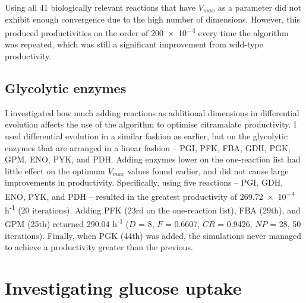 \documentclass[parskip=full, numbers=noenddot]{scrreprt}
\begin{document}
Using all 41 biologically relevant reactions that have $V_{max}$ as a parameter did not exhibit enough convergence due to the high number of dimensions. However, this produced productivities on the order of \num{200e-4} every time the algorithm was repeated, which was still a significant improvement from wild-type productivity.
\subsection{Glycolytic enzymes}
\label{ssec:glycolytic}


I investigated how much adding reactions as additional dimensions in differential evolution affects the use of the algorithm to optimise citramalate productivity. I used differential evolution in a similar fashion as earlier, but on the glycolytic enzymes that are arranged in a linear fashion --  PGI, PFK, FBA, GDH, PGK, GPM, ENO, PYK, and PDH. Adding enzymes lower on the one-reaction list had little effect on the optimum $V_{max}$ values found earlier, and did not cause large improvements in productivity.
Specifically, using five reactions -- PGI, GDH, ENO, PYK, and PDH -- resulted in the greatest productivity of \num{269.72e-4} h\textsuperscript{-1} (20 iterations). Adding PFK (23rd on the one-reaction list), FBA (29th), and GPM (25th) returned \num{290.04} h\textsuperscript{-1} ($D$ = 8, $F$ = 0.6607, $CR$ = 0.9426, $NP$ = 28, 50 iterations). Finally, when PGK (44th) was added, the simulations never managed to achieve a productivity greater than the previous.

\section{Investigating glucose uptake}
\label{sec:glucoseuptake}
\end{document}
